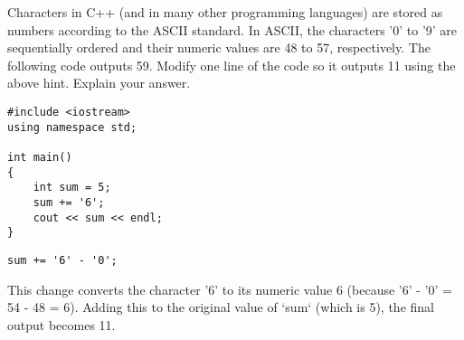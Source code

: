 \item 

Characters in C++ (and in many other programming languages) are stored as numbers according to the ASCII standard. 
In ASCII, the characters '0' to '9' are sequentially ordered and their numeric values are 48 to 57, respectively. 
The following code outputs 59. Modify one line of the code so it outputs 11 using the above hint. Explain your answer.

\begin{AnswerArea}

\begin{verbatim}
#include <iostream>
using namespace std;

int main()
{
    int sum = 5;
    sum += '6';
    cout << sum << endl;
}
\end{verbatim}
\vspace{3in}
\end{AnswerArea}




\begin{Solution}
\begin{verbatim}
sum += '6' - '0';
\end{verbatim}
This change converts the character '6' to its numeric value 6 (because '6' - '0' = 54 - 48 = 6).  
Adding this to the original value of `sum` (which is 5), the final output becomes 11.
\end{Solution}


